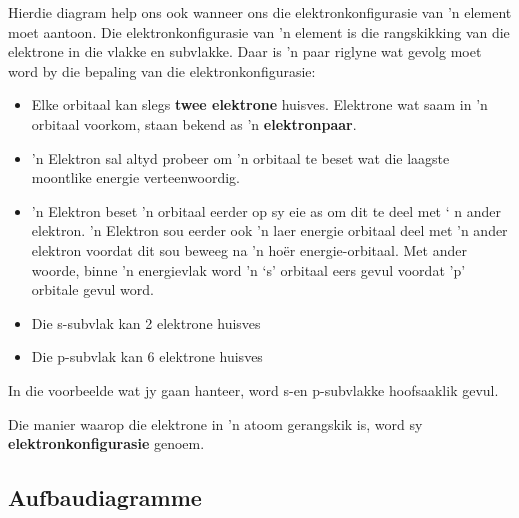 Hierdie diagram help ons ook wanneer ons die elektronkonfigurasie van 'n element moet aantoon. Die elektronkonfigurasie van 'n element is die rangskikking van die elektrone in die vlakke en subvlakke. Daar is 'n paar riglyne wat gevolg moet word by die bepaling van die elektronkonfigurasie:
\par 
\begin{itemize}[noitemsep]
\item Elke orbitaal kan slegs \textbf{twee elektrone} huisves. Elektrone wat saam in 'n orbitaal voorkom, staan bekend as  'n \textbf{elektronpaar}.
\item 'n Elektron sal altyd probeer om 'n orbitaal te beset wat die laagste moontlike energie ver\-teen\-woor\-dig.
\item 'n Elektron beset 'n orbitaal eerder op sy eie as om dit te deel met ‘ n ander elektron. 'n Elektron sou eerder ook 'n laer energie orbitaal deel met 'n ander elektron voordat dit sou beweeg na 'n hoër energie-orbitaal. Met ander woorde, binne 'n energievlak word  'n ‘s' orbitaal eers gevul voordat 'p' orbitale gevul word.
\item Die s-subvlak kan 2 elektrone huisves
\item Die p-subvlak kan 6 elektrone huisves
\end{itemize}
In die voorbeelde wat jy gaan hanteer, word s-en p-subvlakke hoofsaaklik gevul.
\par 
Die manier waarop die elektrone in 'n atoom gerangskik is, word sy \textbf{elektronkonfigurasie} genoem.\par 




\subsection*{Aufbaudiagramme}        
\label{m38741*id259628}

